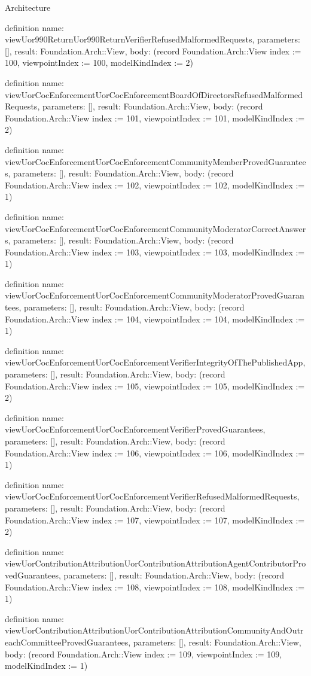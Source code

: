 \begin{lexlean}{Architecture}
\begin{semanticmodule}
definition{
  name: viewUor990ReturnUor990ReturnVerifierRefusedMalformedRequests,
  parameters: [],
  result: Foundation.Arch::View,
  body: (record Foundation.Arch::View {index := 100, viewpointIndex := 100, modelKindIndex := 2})
}

definition{
  name: viewUorCocEnforcementUorCocEnforcementBoardOfDirectorsRefusedMalformedRequests,
  parameters: [],
  result: Foundation.Arch::View,
  body: (record Foundation.Arch::View {index := 101, viewpointIndex := 101, modelKindIndex := 2})
}

definition{
  name: viewUorCocEnforcementUorCocEnforcementCommunityMemberProvedGuarantees,
  parameters: [],
  result: Foundation.Arch::View,
  body: (record Foundation.Arch::View {index := 102, viewpointIndex := 102, modelKindIndex := 1})
}

definition{
  name: viewUorCocEnforcementUorCocEnforcementCommunityModeratorCorrectAnswers,
  parameters: [],
  result: Foundation.Arch::View,
  body: (record Foundation.Arch::View {index := 103, viewpointIndex := 103, modelKindIndex := 1})
}

definition{
  name: viewUorCocEnforcementUorCocEnforcementCommunityModeratorProvedGuarantees,
  parameters: [],
  result: Foundation.Arch::View,
  body: (record Foundation.Arch::View {index := 104, viewpointIndex := 104, modelKindIndex := 1})
}

definition{
  name: viewUorCocEnforcementUorCocEnforcementVerifierIntegrityOfThePublishedApp,
  parameters: [],
  result: Foundation.Arch::View,
  body: (record Foundation.Arch::View {index := 105, viewpointIndex := 105, modelKindIndex := 2})
}

definition{
  name: viewUorCocEnforcementUorCocEnforcementVerifierProvedGuarantees,
  parameters: [],
  result: Foundation.Arch::View,
  body: (record Foundation.Arch::View {index := 106, viewpointIndex := 106, modelKindIndex := 1})
}

definition{
  name: viewUorCocEnforcementUorCocEnforcementVerifierRefusedMalformedRequests,
  parameters: [],
  result: Foundation.Arch::View,
  body: (record Foundation.Arch::View {index := 107, viewpointIndex := 107, modelKindIndex := 2})
}

definition{
  name: viewUorContributionAttributionUorContributionAttributionAgentContributorProvedGuarantees,
  parameters: [],
  result: Foundation.Arch::View,
  body: (record Foundation.Arch::View {index := 108, viewpointIndex := 108, modelKindIndex := 1})
}

definition{
  name: viewUorContributionAttributionUorContributionAttributionCommunityAndOutreachCommitteeProvedGuarantees,
  parameters: [],
  result: Foundation.Arch::View,
  body: (record Foundation.Arch::View {index := 109, viewpointIndex := 109, modelKindIndex := 1})
}


\end{semanticmodule}
\end{lexlean}
